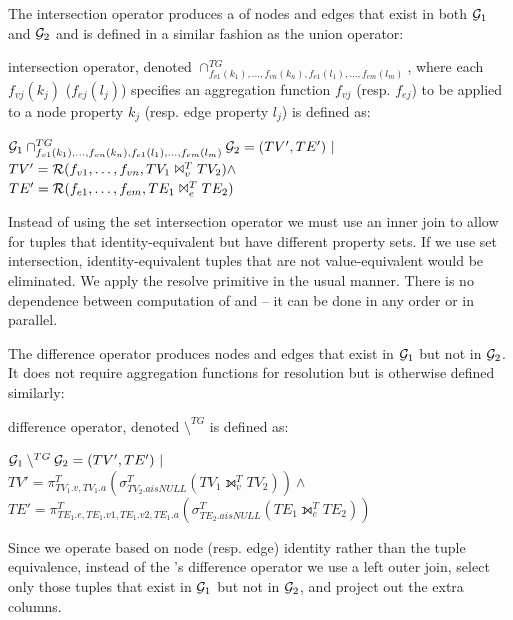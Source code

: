 The \tg intersection operator produces a \tg of nodes and edges that
exist in both $\mathcal{G}_1$ and $\mathcal{G}_2$ and is defined in a similar fashion
as the union operator:

\begin{definition}[Intersection]
\label{def:intertg}
\tg intersection operator, denoted
$\cap^{TG}_{f_{v1}(k_1),\ldots,f_{vn}(k_n),f_{e1}(l_1),\ldots,f_{em}(l_m)}$,
where each $f_{vj}(k_j)$ ($f_{ej}(l_j)$) specifies an aggregation
function $f_{vj}$ (resp. $f_{ej}$) to be applied to a node property
$k_j$ (resp. edge property $l_j$) is defined as:

$\mathcal{G}_1 \cap^{TG}_{f_{v1}(k_1),\ldots,f_{vn}(k_n),f_{e1}(l_1),\ldots,f_{em}(l_m)} \mathcal{G}_2 = (TV', TE') ~|~ $\\$TV' = \mathcal{R}(f_{v1},\ldots,f_{vn},TV_1 \Join^T_{v} TV_2) \land $\\$TE' = \mathcal{R}(f_{e1},\ldots,f_{em},TE_1 \Join^T_{e} TE_2)$
\end{definition}

Instead of using the \tra set intersection operator we must use an
inner join to allow for tuples that identity-equivalent but have
different property sets.  If we use set intersection,
identity-equivalent tuples that are not value-equivalent would be
eliminated.  We apply the resolve primitive in the usual manner.
There is no dependence between computation of \tv and \te -- it can be
done in any order or in parallel.

The difference operator produces nodes and edges that exist in
$\mathcal{G}_1$ but not in $\mathcal{G}_2$.  It does not require aggregation
functions for resolution but is otherwise defined similarly:

\begin{definition}[Difference]
\label{def:difftg}
\tg difference operator, denoted
$\setminus^{TG}$ is defined as:

$\mathcal{G}_1 \setminus^{TG} \mathcal{G}_2 = (TV', TE') ~|~ $\\$TV' = \pi^T_{TV_1.v,TV_1.a}(\sigma^T_{TV_2.a is NULL}(TV_1 \leftouterjoin^T_{v} TV_2)) \land $\\$TE' = \pi^T_{TE_1.e,TE_1.v1,TE_1.v2,TE_1.a}(\sigma^T_{TE_2.a is NULL}(TE_1 \leftouterjoin^T_{e} TE_2))$
\end{definition}

Since we operate based on node (resp. edge) identity rather than the tuple
equivalence, instead of the \tra's difference operator we use a left
outer join, select only those tuples that exist in $\mathcal{G}_1$ but not in
$\mathcal{G}_2$, and project out the extra columns.

